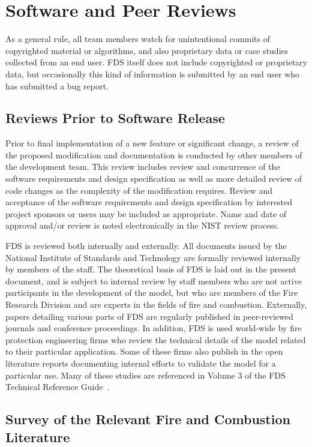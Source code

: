 \documentclass[11pt]{book}
\begin{document}
\section{Software and Peer Reviews}


As a general rule, all team members watch for unintentional commits of copyrighted material or algorithms, and also proprietary data or case studies collected from an end user. FDS itself does not include copyrighted or proprietary data, but occasionally this kind of information is submitted by an end user who has submitted a bug report.

\subsection{Reviews Prior to Software Release}

Prior to final implementation of a new feature or significant change, a review of the proposed modification and documentation is conducted by other members of the development team.  This review includes review and concurrence of the software requirements and design specification as well as more detailed review of code changes as the complexity of the modification requires. Review and acceptance of the software requirements and design specification by interested project sponsors or users may be included as appropriate. Name and date of approval and/or review is noted electronically in the NIST review process.

FDS is reviewed both internally and externally. All documents issued by the National Institute of Standards and Technology are formally reviewed internally by members of the staff. The theoretical basis of FDS is laid out in the present document, and is subject to internal review by staff members who are not active participants in the development of the model, but who are members of the Fire Research Division and are experts in the fields of fire and combustion. Externally, papers detailing various parts of FDS are regularly published in peer-reviewed journals and conference proceedings. In addition, FDS is used world-wide by fire protection engineering firms who review the technical details of the model related to their particular application. Some of these firms also publish in the open literature reports documenting internal efforts to validate the model for a particular use. Many of these studies are referenced in Volume 3 of the FDS Technical Reference Guide~\cite{FDS_Tech_Guide}.

\subsection{Survey of the Relevant Fire and Combustion Literature}
\end{document}
